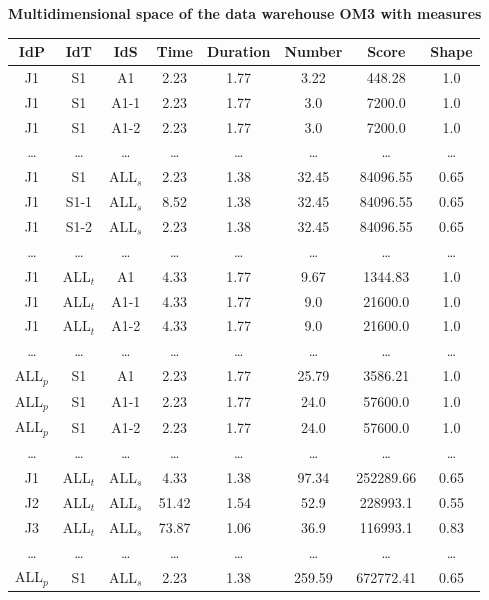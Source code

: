 \documentclass{article}
\begin{document}
\begin{center}
\textbf{Multidimensional space of the data warehouse OM3 with measures}
\end{center}

\vspace{1em}

\begin{tabular}{cccccccc}
\toprule
\textbf{IdP} & \textbf{IdT} & \textbf{IdS} & \textbf{Time} & \textbf{Duration} & \textbf{Number} & \textbf{Score} & \textbf{Shape} \\
\midrule
J1 & S1 & A1 & 2.23 & 1.77 & 3.22 & 448.28 & 1.0 \\
J1 & S1 & A1-1 & 2.23 & 1.77 & 3.0 & 7200.0 & 1.0 \\
J1 & S1 & A1-2 & 2.23 & 1.77 & 3.0 & 7200.0 & 1.0 \\
\dots & \dots & \dots & \dots & \dots & \dots & \dots & \dots \\
J1 & S1 & ALL$_s$ & 2.23 & 1.38 & 32.45 & 84096.55 & 0.65 \\
J1 & S1-1 & ALL$_s$ & 8.52 & 1.38 & 32.45 & 84096.55 & 0.65 \\
J1 & S1-2 & ALL$_s$ & 2.23 & 1.38 & 32.45 & 84096.55 & 0.65 \\
\dots & \dots & \dots & \dots & \dots & \dots & \dots & \dots \\
J1 & ALL$_t$ & A1 & 4.33 & 1.77 & 9.67 & 1344.83 & 1.0 \\
J1 & ALL$_t$ & A1-1 & 4.33 & 1.77 & 9.0 & 21600.0 & 1.0 \\
J1 & ALL$_t$ & A1-2 & 4.33 & 1.77 & 9.0 & 21600.0 & 1.0 \\
\dots & \dots & \dots & \dots & \dots & \dots & \dots & \dots \\
ALL$_p$ & S1 & A1 & 2.23 & 1.77 & 25.79 & 3586.21 & 1.0 \\
ALL$_p$ & S1 & A1-1 & 2.23 & 1.77 & 24.0 & 57600.0 & 1.0 \\
ALL$_p$ & S1 & A1-2 & 2.23 & 1.77 & 24.0 & 57600.0 & 1.0 \\
\dots & \dots & \dots & \dots & \dots & \dots & \dots & \dots \\
J1 & ALL$_t$ & ALL$_s$ & 4.33 & 1.38 & 97.34 & 252289.66 & 0.65 \\
J2 & ALL$_t$ & ALL$_s$ & 51.42 & 1.54 & 52.9 & 228993.1 & 0.55 \\
J3 & ALL$_t$ & ALL$_s$ & 73.87 & 1.06 & 36.9 & 116993.1 & 0.83 \\
\dots & \dots & \dots & \dots & \dots & \dots & \dots & \dots \\
ALL$_p$ & S1 & ALL$_s$ & 2.23 & 1.38 & 259.59 & 672772.41 & 0.65 \\

\end{tabular}
\end{document}
